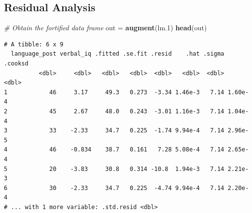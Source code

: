 \documentclass[]{book}
\newenvironment{Shaded}{\begin{snugshade}}{\end{snugshade}}
\newcommand{\CommentTok}[1]{\textcolor[rgb]{0.56,0.35,0.01}{\textit{#1}}}
\newcommand{\DataTypeTok}[1]{\textcolor[rgb]{0.13,0.29,0.53}{#1}}
\newcommand{\DecValTok}[1]{\textcolor[rgb]{0.00,0.00,0.81}{#1}}
\newcommand{\FloatTok}[1]{\textcolor[rgb]{0.00,0.00,0.81}{#1}}
\newcommand{\KeywordTok}[1]{\textcolor[rgb]{0.13,0.29,0.53}{\textbf{#1}}}
\newcommand{\NormalTok}[1]{#1}
\newcommand{\OperatorTok}[1]{\textcolor[rgb]{0.81,0.36,0.00}{\textbf{#1}}}
\newcommand{\StringTok}[1]{\textcolor[rgb]{0.31,0.60,0.02}{#1}}
\begin{document}
\hypertarget{residual-analysis}{%
\subsection{Residual Analysis}\label{residual-analysis}}

\begin{Shaded}
\begin{Highlighting}[]
\CommentTok{# Obtain the fortified data frame}
\NormalTok{out =}\StringTok{ }\KeywordTok{augment}\NormalTok{(lm}\FloatTok{.1}\NormalTok{)}
\KeywordTok{head}\NormalTok{(out)}
\end{Highlighting}
\end{Shaded}

\begin{verbatim}
# A tibble: 6 x 9
  language_post verbal_iq .fitted .se.fit .resid    .hat .sigma .cooksd
          <dbl>     <dbl>   <dbl>   <dbl>  <dbl>   <dbl>  <dbl>   <dbl>
1            46     3.17     49.3   0.273  -3.34 1.46e-3   7.14 1.60e-4
2            45     2.67     48.0   0.243  -3.01 1.16e-3   7.14 1.04e-4
3            33    -2.33     34.7   0.225  -1.74 9.94e-4   7.14 2.96e-5
4            46    -0.834    38.7   0.161   7.28 5.08e-4   7.14 2.65e-4
5            20    -3.83     30.8   0.314 -10.8  1.94e-3   7.14 2.21e-3
6            30    -2.33     34.7   0.225  -4.74 9.94e-4   7.14 2.20e-4
# ... with 1 more variable: .std.resid <dbl>
\end{verbatim}

\begin{Shaded}
\end{Shaded}
\end{document}
